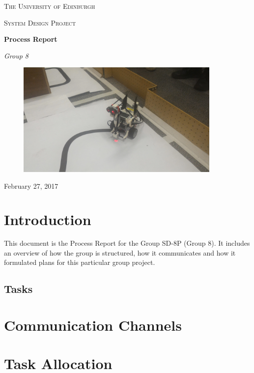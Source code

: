 \documentclass[a4paper,12pt]{article}
\begin{document}
\begin{titlepage}
	\centering
	{\scshape\LARGE The University of Edinburgh \par}
	\vspace{1cm}
	{\scshape\Large System Design Project\par}
	\vspace{1.5cm}
	{\huge\bfseries Process Report\par}
	\vspace{2cm}
	{\Large\itshape Group 8\par}
	\vfill
\begin{figure}[H]
    \centering
    \includegraphics[width=10cm]{robot}
    \label{fig:robot}
\end{figure}
	\vfill

	{\large February 27, 2017\par}
\end{titlepage}

\section{Introduction}
This document is the Process Report for the Group SD-8P (Group 8). It includes an overview of how the group is structured, how it communicates and how it formulated plans for this particular group project.
\subsection{Tasks}


\section{Communication Channels}


\section{Task Allocation}

\end{document}
